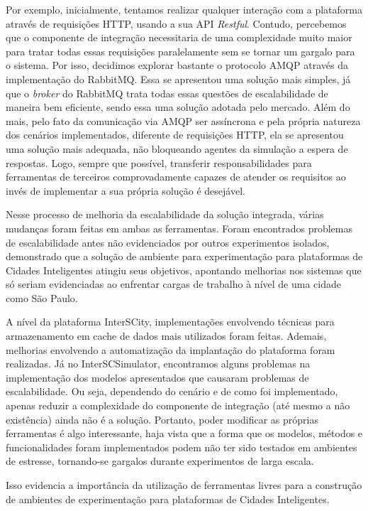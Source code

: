 Por exemplo, inicialmente, tentamos realizar qualquer interação com a plataforma através de requisições HTTP, usando a sua API \textit{Restful}.
Contudo, percebemos que o componente de integração necessitaria de uma complexidade muito maior para tratar todas essas requisições paralelamente sem se tornar um
gargalo para o sistema.
Por isso, decidimos explorar bastante o protocolo AMQP através da implementação do RabbitMQ.
Essa se apresentou uma solução mais simples, já que o \textit{broker} do RabbitMQ trata todas essas questões de escalabilidade de maneira bem eficiente, sendo essa
uma solução adotada pelo mercado.
Além do mais, pelo fato da comunicação via AMQP ser assíncrona e pela própria natureza dos cenários implementados, diferente de requisições HTTP, ela se apresentou uma
solução mais adequada, não bloqueando agentes da simulação a espera de respostas.
Logo, sempre que possível, transferir responsabilidades para ferramentas de terceiros comprovadamente capazes de atender os requisitos ao invés de implementar a sua
própria solução é desejável.

Nesse processo de melhoria da escalabilidade da solução integrada, várias mudanças foram feitas em ambas as ferramentas.
Foram encontrados problemas de escalabilidade antes não evidenciados por outros experimentos isolados, demonstrado que a solução de ambiente para experimentação para
plataformas de Cidades Inteligentes atingiu seus objetivos, apontando melhorias nos sistemas que só seriam evidenciadas ao enfrentar cargas de trabalho à nível de uma
cidade como São Paulo.

A nível da plataforma InterSCity, implementações envolvendo técnicas para armazenamento em cache de dados mais utilizados foram feitas.
Ademais, melhorias envolvendo a automatização da implantação do plataforma foram realizadas.
Já no InterSCSimulator, encontramos alguns problemas na implementação dos modelos apresentados que causaram problemas de escalabilidade.
Ou seja, dependendo do cenário e de como foi implementado, apenas reduzir a complexidade do componente de integração (até mesmo a não existência) ainda não é a solução.
Portanto, poder modificar as próprias ferramentas é algo interessante, haja vista que a forma que os modelos, métodos e funcionalidades foram implementados podem não
ter sido testados em ambientes de estresse, tornando-se gargalos durante experimentos de larga escala.

Isso evidencia a importância da utilização de ferramentas livres para a construção de ambientes de experimentação para plataformas de Cidades Inteligentes.
